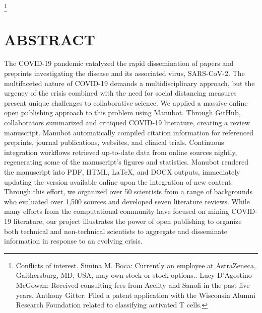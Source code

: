 \documentclass[twocolumn]{ceurart}
\begin{document}


\maketitle

{\let\thefootnote\relax\footnote{Conflicts of interest. Simina M. Boca: Currently an employee at AstraZeneca, Gaithersburg, MD, USA, may own stock or stock options.. Lucy D'Agostino McGowan: Received consulting fees from Acelity and Sanofi in the past five years. Anthony Gitter: Filed a patent application with the Wisconsin Alumni Research Foundation related to classifying activated T cells.}}

\hypertarget{abstract}{%
\section{ABSTRACT}\label{abstract}}

The COVID-19 pandemic catalyzed the rapid dissemination of papers and preprints investigating the disease and its associated virus, SARS-CoV-2.
The multifaceted nature of COVID-19 demands a multidisciplinary approach, but the urgency of the crisis combined with the need for social distancing measures present unique challenges to collaborative science.
We applied a massive online open publishing approach to this problem using Manubot.
Through GitHub, collaborators summarized and critiqued COVID-19 literature, creating a review manuscript.
Manubot automatically compiled citation information for referenced preprints, journal publications, websites, and clinical trials.
Continuous integration workflows retrieved up-to-date data from online sources nightly, regenerating some of the manuscript's figures and statistics.
Manubot rendered the manuscript into PDF, HTML, LaTeX, and DOCX outputs, immediately updating the version available online upon the integration of new content.
Through this effort, we organized over 50 scientists from a range of backgrounds who evaluated over 1,500 sources and developed seven literature reviews.
While many efforts from the computational community have focused on mining COVID-19 literature, our project illustrates the power of open publishing to organize both technical and non-technical scientists to aggregate and disseminate information in response to an evolving crisis.
\end{document}
